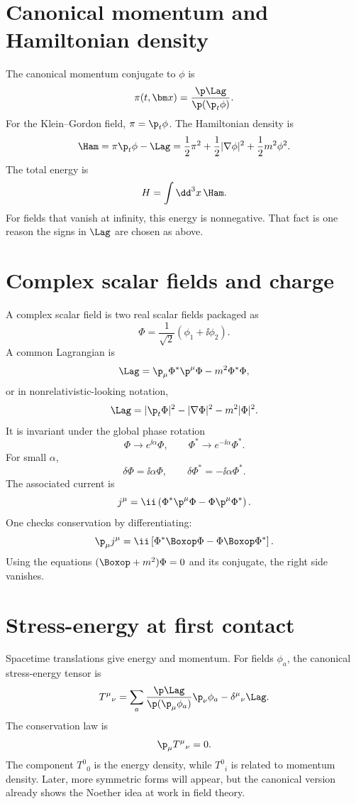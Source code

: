 \section{Canonical momentum and Hamiltonian density}

The canonical momentum conjugate to \(\phi\) is
\[
  \pi(t,\bm x)=\frac{\p\Lag}{\p(\p_t\phi)}.
\]
For the Klein--Gordon field, \(\pi=\p_t\phi\).  The Hamiltonian density is
\[
  \Ham=\pi\p_t\phi-\Lag
  =
  \frac12\pi^2+\frac12|\nabla\phi|^2+\frac12m^2\phi^2.
\]
The total energy is
\[
  H=\int\dd^3x\,\Ham.
\]
For fields that vanish at infinity, this energy is nonnegative.  That fact is one reason the signs in \(\Lag\) are chosen as above.

\section{Complex scalar fields and charge}

A complex scalar field is two real scalar fields packaged as
\[
  \Phi=\frac{1}{\sqrt2}(\phi_1+\ii\phi_2).
\]
A common Lagrangian is
\[
  \Lag=\p_\mu\Phi^*\p^\mu\Phi-m^2\Phi^*\Phi,
\]
or in nonrelativistic-looking notation,
\[
  \Lag=|\p_t\Phi|^2-|\nabla\Phi|^2-m^2|\Phi|^2.
\]
It is invariant under the global phase rotation
\[
  \Phi\to e^{\ii\alpha}\Phi,\qquad
  \Phi^*\to e^{-\ii\alpha}\Phi^*.
\]
For small \(\alpha\),
\[
  \delta\Phi=\ii\alpha\Phi,\qquad
  \delta\Phi^*=-\ii\alpha\Phi^*.
\]
The associated current is
\[
  j^\mu=
  \ii\left(
  \Phi^*\p^\mu\Phi-\Phi\p^\mu\Phi^*
  \right).
\]
One checks conservation by differentiating:
\[
  \p_\mu j^\mu
  =
  \ii\left[
  \Phi^*\Boxop\Phi-\Phi\Boxop\Phi^*
  \right].
\]
Using the equations \((\Boxop+m^2)\Phi=0\) and its conjugate, the right side vanishes.

\section{Stress-energy at first contact}

Spacetime translations give energy and momentum.  For fields \(\phi_a\), the canonical stress-energy tensor is
\[
  T^\mu{}_\nu
  =
  \sum_a
  \frac{\p\Lag}{\p(\p_\mu\phi_a)}\p_\nu\phi_a
  -
  \delta^\mu{}_\nu\Lag.
\]
The conservation law is
\[
  \p_\mu T^\mu{}_\nu=0.
\]
The component \(T^0{}_0\) is the energy density, while \(T^0{}_i\) is related to momentum density.  Later, more symmetric forms will appear, but the canonical version already shows the Noether idea at work in field theory.

